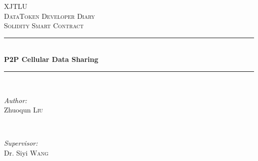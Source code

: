 \begin{titlepage}

\newcommand{\HRule}{\rule{\linewidth}{0.5mm}} %

\centering %
 

\textsc{\LARGE XJTLU}\\[1.5cm] %
\textsc{\Large DataToken Developer Diary}\\[0.5cm] %
\textsc{\large Solidity Smart Contract}\\[0.5cm] %


\HRule \\[0.4cm]
{ \huge \bfseries P2P Cellular Data Sharing}\\[0.4cm] %
\HRule \\[1.5cm]
 

\begin{minipage}{0.4\textwidth}
\begin{flushleft} \large
\emph{Author:}\\
Zhuoqun \textsc{Liu} %
\end{flushleft}
\end{minipage}
~
\begin{minipage}{0.4\textwidth}
\begin{flushright} \large
\emph{Supervisor:} \\
Dr. Siyi \textsc{Wang} %
\end{flushright}
\end{minipage}\\[2cm]



\end{titlepage}

